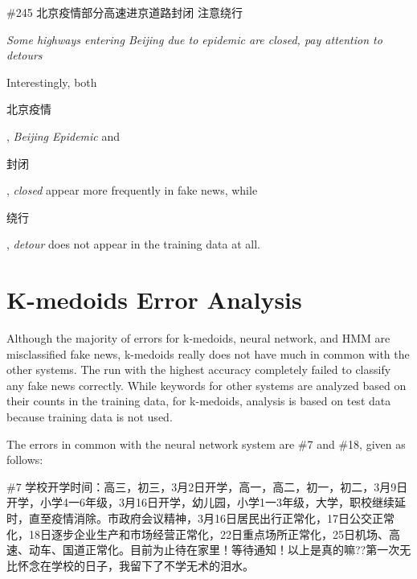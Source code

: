\documentclass [11pt, proquest] {uwthesis}[2020/02/24]
\begin{document}
\begin{CJK*}{UTF8}{gbsn}\#245 北京疫情部分高速进京道路封闭 注意绕行\end{CJK*}

\textit{Some highways entering Beijing due to epidemic are closed, pay attention to detours}

Interestingly, both \begin{CJK*}{UTF8}{gbsn}北京疫情\end{CJK*}, \textit{Beijing Epidemic} and \begin{CJK*}{UTF8}{gbsn}封闭\end{CJK*}, \textit{closed} appear more frequently in fake news, while \begin{CJK*}{UTF8}{gbsn}绕行\end{CJK*}, \textit{detour} does not appear in the training data at all.

\section{K-medoids Error Analysis}
Although the majority of errors for k-medoids, neural network, and HMM are misclassified fake news, k-medoids really does not have much in common with the other systems. The run with the highest accuracy completely failed to classify any fake news correctly. While keywords for other systems are analyzed based on their counts in the training data, for k-medoids, analysis is based on test data because training data is not used.

The errors in common with the neural network system are \#7 and \#18, given as follows:

\begin{CJK*}{UTF8}{gbsn}\#7 学校开学时间：高三，初三，3月2日开学，高一，高二，初一，初二，3月9日开学，小学4一6年级，3月16日开学，幼儿园，小学1一3年级，大学，职校继续延时，直至疫情消除。市政府会议精神，3月16日居民出行正常化，17日公交正常化，18日逐步企业生产和市场经营正常化，22日重点场所正常化，25日机场、高速、动车、国道正常化。目前为止待在家里！等待通知！以上是真的嘛??第一次无比怀念在学校的日子，我留下了不学无术的泪水。\end{CJK*}
\end{document}
